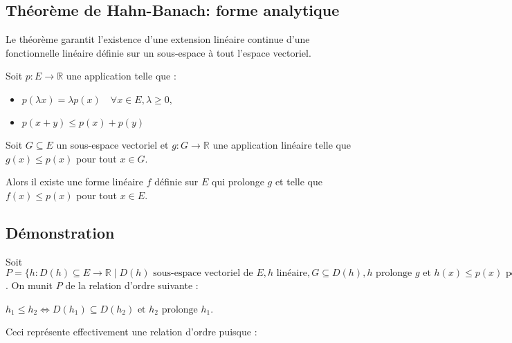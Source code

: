 \documentclass{article}
\theoremstyle{definition}
\theoremstyle{plain}
\begin{document}
\subsection{Théorème de Hahn-Banach: forme analytique}
Le théorème garantit l'existence d'une extension linéaire continue d'une fonctionnelle linéaire définie sur un sous-espace à tout l'espace vectoriel.

Soit $p : E \rightarrow \mathbb{R}$ une application telle que :

\begin{itemize}
    \item $p(\lambda x) = \lambda p(x) \quad \forall x \in E, \lambda \geq 0,$
    \item $p(x + y) \leq p(x) + p(y)$
\end{itemize}

Soit $G \subseteq E$ un sous-espace vectoriel et $g : G \rightarrow \mathbb{R}$ une application linéaire telle que $g(x) \leq p(x)$ pour tout $x \in G$.

Alors il existe une forme linéaire $f$ définie sur $E$ qui prolonge $g$ et telle que $f(x) \leq p(x)$ pour tout $x \in E$.


\subsection{Démonstration}

Soit $P = \{ h : D(h) \subseteq E \rightarrow \mathbb{R} \mid D(h) \text{ sous-espace vectoriel de } E, h \text{ linéaire}, G \subseteq D(h), h \text{ prolonge } g \text{ et } h(x) \leq p(x) \text{ pour tout } x \in D(h) \}$.
On munit $P$ de la relation d'ordre suivante :

$h_1 \leq h_2 \Leftrightarrow D(h_1) \subseteq D(h_2) \text{ et } h_2 \text{ prolonge } h_1$.

Ceci représente effectivement une relation d'ordre puisque :
\end{document}
